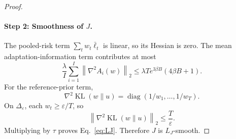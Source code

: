 \documentclass{article}
\newcommand{\KL}{\operatorname{KL}}
\newcommand{\diag}{\operatorname{diag}}
\newcommand{\simplex}{\Delta}
\newcommand{\norm}[1]{\left\lVert #1 \right\rVert}
\newcommand{\epssimplex}{\simplex_{\varepsilon}}
\begin{document}
\begin{proof}
\paragraph{Step 2: Smoothness of \(J\).}
The pooled-risk term \(\sum_t w_t \bar\ell_t\) is linear, so its Hessian is zero. The mean adaptation-information term contributes at most
\begin{equation}
    \frac{\lambda}{I}\sum_{i=1}^{I} \norm{\nabla^2 A_i(w)}_2
    \le
    \lambda T e^{3\beta B}(4\beta B + 1).
\end{equation}
For the reference-prior term,
\begin{equation}
    \nabla^2 \KL(w\|u)=\diag(1/w_1,\dots,1/w_T).
\end{equation}
On \(\epssimplex\), each \(w_t \ge \varepsilon/T\), so
\begin{equation}
    \norm{\nabla^2 \KL(w\|u)}_2 \le \frac{T}{\varepsilon}.
\end{equation}
Multiplying by \(\tau\) proves Eq.~\eqref{eq:LJ}. Therefore \(J\) is \(L_J\)-smooth.


\end{proof}
\end{document}
